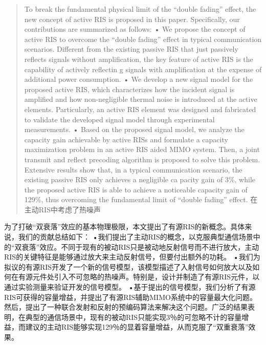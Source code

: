 \documentclass[UTF8]{ctexart}
\begin{document}
    \begin{quote}
To break the fundamental physical limit of the ``double fading'' effect,
the new concept of active RIS is proposed in this paper. Specifically,
our contributions are summarized as follows: • We propose the concept of
active RIS to overcome the ``double fading'' effect in typical
communication scenarios. Different from the existing passive RIS that
just passively reflects signals without amplification, the key feature
of active RIS is the capability of actively reflectin g signals with
amplification at the expense of additional power consumption. • We
develop a new signal model for the proposed active RIS, which
characterizes how the incident signal is amplified and how
non-negligible thermal noise is introduced at the active elements.
Particularly, an active RIS element was designed and fabricated to
validate the developed signal model through experimental measurements. •
Based on the proposed signal model, we analyze the capacity gain
achievable by active RISs and formulate a capacity maximization problem
in an active RIS aided MIMO system. Then, a joint transmit and reflect
precoding algorithm is proposed to solve this problem. Extensive results
show that, in a typical communication scenario, the existing passive RIS
only achieves a negligible ca pacity gain of 3\%, while the proposed
active RIS is able to achieve a noticeable capacity gain of 129\%, thus
overcoming the fundamental limit of ``double fading'' effect.
在主动RIS中考虑了热噪声
\end{quote}

为了打破``双衰落''效应的基本物理极限，本文提出了有源RIS的新概念。具体来说，我们的贡献总结如下：
•我们提出了主动RIS的概念，以克服典型通信场景中的``双衰落''效应。不同于现有的被动RIS只是被动地反射信号而不进行放大，主动RIS的关键特征是能够通过放大来主动反射信号，但要付出额外的功耗。
•我们为拟议的有源RIS开发了一个新的信号模型，该模型描述了入射信号如何放大以及如何在有源元件处引入不可忽略的热噪声。特别是，设计并制造了有源RIS元件，以通过实验测量来验证开发的信号模型。
•基于提出的信号模型，我们分析了有源RIS可获得的容量增益，并提出了有源RIS辅助MIMO系统中的容量最大化问题。然后，提出了一种联合发射和反射的预编码算法来解决这个问题。广泛的结果表明，在典型的通信场景中，现有的被动RIS只能实现3％的可忽略不计的容量增益，而建议的主动RIS能够实现129％的显着容量增益，从而克服了``双重衰落''效果。
\end{document}
